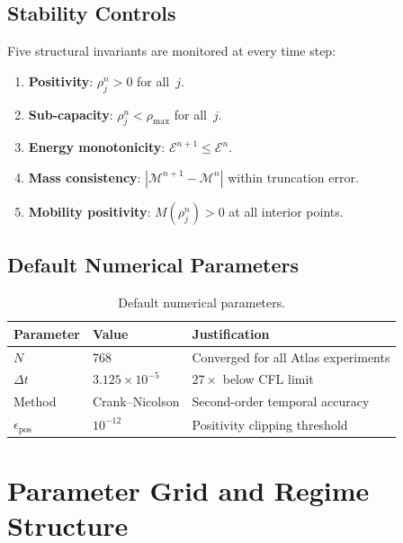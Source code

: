 \documentclass[11pt,twoside,openright]{book}
\theoremstyle{definition}
\theoremstyle{plain}
\theoremstyle{definition}
\theoremstyle{remark}
\newcommand{\rhomax}{\rho_{\max}}
\newcommand{\Energy}{\mathcal{E}}
\begin{document}
\section{Stability Controls}\label{sec:stability}

Five structural invariants are monitored at every time step:
\begin{enumerate}
\item \textbf{Positivity}: \(\rho_j^n > 0\) for all~\(j\).
\item \textbf{Sub-capacity}: \(\rho_j^n < \rhomax\) for all~\(j\).
\item \textbf{Energy monotonicity}: \(\Energy^{n+1} \leq \Energy^n\).
\item \textbf{Mass consistency}: \(|\mathcal{M}^{n+1} - \mathcal{M}^n|\) within truncation error.
\item \textbf{Mobility positivity}: \(M(\rho_j^n) > 0\) at all interior points.
\end{enumerate}

\section{Default Numerical Parameters}\label{sec:defaults}

\begin{table}[ht]
\centering
\caption{Default numerical parameters.}\label{tab:defaults}
\begin{tabular}{@{}llp{5cm}@{}}
\toprule
Parameter & Value & Justification \\
\midrule
\(N\)           & 768                    & Converged for all Atlas experiments \\
\(\Delta t\)    & \(3.125 \times 10^{-5}\) & \(27\times\) below CFL limit \\
Method          & Crank--Nicolson        & Second-order temporal accuracy \\
\(\epsilon_{\mathrm{pos}}\) & \(10^{-12}\) & Positivity clipping threshold \\
\bottomrule
\end{tabular}
\end{table}


\chapter{Parameter Grid and Regime Structure}\label{ch:parameters}
\end{document}
